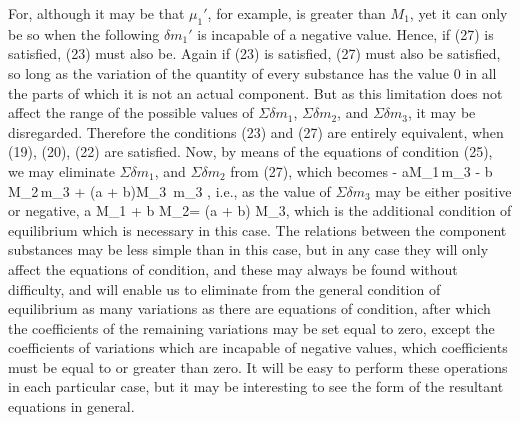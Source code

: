 \documentclass[12pt]{article}
\begin{document}
For, although it may be that $\mu_1'$, for example, is greater than $M_1$, yet it can only be so when the following $\delta m_1'$ is incapable of a negative value. Hence, if (27) is satisfied, (23) must also be. Again if (23) is satisfied, (27) must also be satisfied, so long as the variation of the quantity of every substance has the value 0 in all the parts of which it is not an actual component. But as this limitation does not affect the range of the possible values of  $\Sigma \delta m_1$, $\Sigma \delta m_2$, and $\Sigma \delta m_3$, it may be disregarded. Therefore the conditions (23) and (27) are entirely equivalent, when (19), (20), (22) are satisfied. Now, by means of the equations of condition (25), we may eliminate $\Sigma \delta m_1$, and $\Sigma \delta m_2$ from (27), which becomes
\eqs - aM_1\,\Sigma \delta m_3 - b M_2\,\Sigma \delta m_3 + (a + b)M_3 \,\Sigma \delta m_3 ,        \label{28}\eqe
i.e., as the value of $\Sigma \delta m_3$ may be either positive or negative,
\eqs a M_1 + b M_2= (a + b) M_3,     \label{29}\eqe
which is the additional condition of equilibrium which is necessary in this case.
The relations between the component substances may be less simple than in this case, but in any case they will only affect the equations of condition, and these may always be found without difficulty, and will enable us to eliminate from the general condition of equilibrium as many variations as there are equations of condition, after which the coefficients of the remaining variations may be set equal to zero, except the coefficients of variations which are incapable of negative values, which coefficients must be equal to or greater than zero. It will be easy to perform these operations in each particular case, but it may be interesting to see the form of the resultant equations in general.
\end{document}
